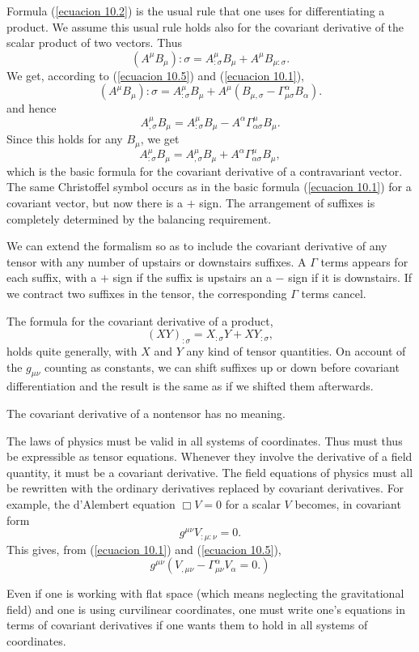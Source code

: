 Formula (\ref{ecuacion 10.2}) is the usual rule that one uses for 
differentiating a product. We assume this usual rule holds also for the 
covariant derivative of the scalar product of two vectors. Thus
\[
 \left( A^{\mu} B_{\mu}\right):{\sigma} =  
 A^{\mu}_{:\sigma}B_{\mu} +  A^{\mu} B_{\mu:\sigma}.
\]
We get, according to (\ref{ecuacion 10.5}) and (\ref{ecuacion 10.1}),
\[
 \left( A^{\mu} B_{\mu}\right){:\sigma} =  
 A^{\mu}_{:\sigma}B_{\mu} 
 + A^{\mu} \left( B_{\mu,\sigma} -\Gamma^{\alpha}_{\mu\sigma} B_{\alpha} 
\right).
\]
and hence 
\[
 A^{\mu}_{,\sigma} B_{\mu} = A^{\mu}_{:\sigma}B_{\mu} 
 - A^{\alpha}\Gamma^{\mu}_{\alpha\sigma} B_{\mu}.
\]
Since this holds for any $B_{\mu}$, we get
\begin{equation}
 \label{ecuacion 10.7}
   A^{\mu}_{:\sigma}B_{\mu} = A^{\mu}_{,\sigma} B_{\mu}  
 + A^{\alpha}\Gamma^{\mu}_{\alpha\sigma} B_{\mu},
\end{equation}
which is the basic formula for the covariant derivative of a contravariant 
vector. The same Christoffel symbol occurs as  in the basic formula 
(\ref{ecuacion 10.1}) for a covariant vector, but now there is a $+$ sign. The 
arrangement of suffixes is completely determined by the balancing requirement.

We can extend the formalism so as to include the covariant derivative of any 
tensor with any number of upstairs or downstairs suffixes. A $\Gamma$ terms 
appears for each suffix, with a $+$ sign if the suffix is upstairs an a $-$ 
sign if it is downstairs. If we contract two suffixes in the tensor, the 
corresponding $\Gamma$ terms cancel.

The formula for the covariant derivative of a product,
\begin{equation}
 \label{ecuacion 10.8}
 \left(X Y\right)_{:\sigma} = X_{:\sigma} Y + X Y_{:\sigma},
\end{equation}
holds quite generally, with $X$ and $Y$ any kind of tensor quantities. On 
account of the $g_{\mu\nu}$ counting as constants, we can shift suffixes up or 
down before covariant differentiation and the result is the same as if we 
shifted them afterwards.

The covariant derivative of a nontensor has no meaning.

The laws of physics must be valid in all systems of coordinates. Thus must thus 
be expressible as tensor equations. Whenever they involve the derivative of a 
field quantity, it must be a covariant derivative. The field equations of 
physics must all be rewritten with the ordinary derivatives replaced by 
covariant derivatives. For example, the d'Alembert equation $\Box V = 0$ for a 
scalar $V$ becomes, in covariant form
\[
 g^{\mu\nu} V_{:\mu:\nu} = 0.
\]
This gives, from (\ref{ecuacion 10.1}) and (\ref{ecuacion 10.5}),
\begin{equation}
 \label{ecuacion 10.9}
 g^{\mu\nu}\left( V_{,\mu\nu} - \Gamma^{\alpha}_{\mu\nu}V_{\alpha} = 0.\right)
\end{equation}

Even if one is working with flat space (which means neglecting the 
gravitational field) and one is using curvilinear coordinates, one must write 
one's equations in terms of covariant derivatives if one wants them to hold in 
all systems of coordinates.
